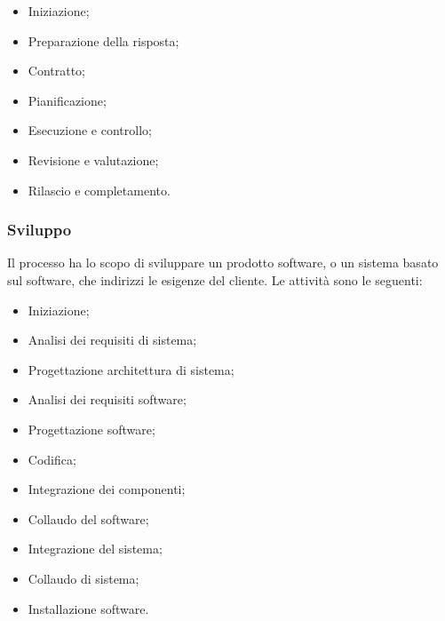 \begin{itemize}

\item Iniziazione;

\item Preparazione della risposta;

\item Contratto;

\item Pianificazione;

\item Esecuzione e controllo;

\item Revisione e valutazione;

\item Rilascio e completamento.

\end{itemize}

\subsubsection{Sviluppo}
Il processo ha lo scopo di sviluppare un prodotto software, o un sistema basato sul software, che indirizzi le esigenze del cliente.
Le attività sono le seguenti:

\begin{itemize}

\item Iniziazione;

\item Analisi dei requisiti di sistema;

\item Progettazione architettura di sistema;

\item Analisi dei requisiti software;

\item Progettazione software;

\item Codifica;

\item Integrazione dei componenti;

\item Collaudo del software;

\item Integrazione del sistema;

\item Collaudo di sistema;

\item Installazione software.

\end{itemize}

